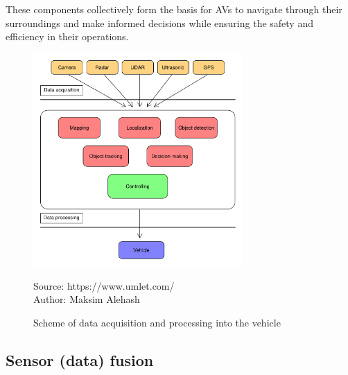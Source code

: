 \documentclass[10pt,oneside,english,a4paper]{article}
\begin{document}
\par These components collectively form the basis for AVs to navigate through their surroundings and make informed decisions while ensuring the safety and efficiency in their operations.

\begin{figure}
\centering
\includegraphics[width=8cm]{algoritmy.pdf}
\caption{Scheme of data acquisition and processing into the vehicle}
{Source: https://www.umlet.com/}\\
{Author: Maksim Alehash}
\label{fig:p_algoritmy}
\end{figure}

\subsection{Sensor (data) fusion} \label{fusion}
\end{document}
